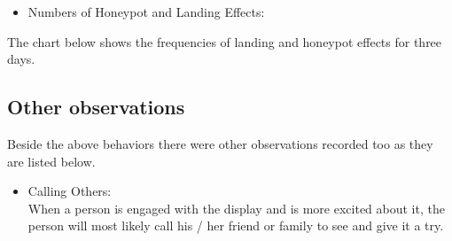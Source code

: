 \begin{itemize}

\item Numbers of Honeypot and Landing Effects: \\

\end{itemize}

The chart below shows the frequencies of landing and honeypot effects for three days. 


\begin{minipage}{\textwidth}
\begin{flushleft} 
\begin{table}[H]
\label{tab:landingandhonypot}
\end{table}
\end{flushleft} 
\end{minipage}


\subsection{Other observations}
Beside the above behaviors there were other observations recorded too as they are listed below. 
\begin{itemize}

\item Calling Others: \\
When a person is engaged with the display and is more excited about it, the person will most likely call his / her friend or family to see and give it a try. 
\end{itemize}

